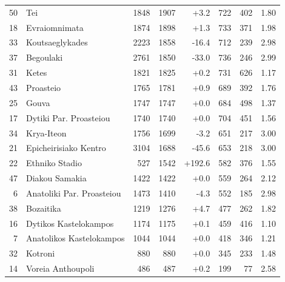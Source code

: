 \begin{scriptsize}
\begin{longtable}{rp{3.4cm}rrrrrr}
50 & Tei & 1848 & 1907 & +3.2 & 722 & 402 & 1.80 \\
18 & Evraiomnimata & 1874 & 1898 & +1.3 & 733 & 371 & 1.98 \\
33 & Koutsaeglykades & 2223 & 1858 & -16.4 & 712 & 239 & 2.98 \\
37 & Begoulaki & 2761 & 1850 & -33.0 & 736 & 246 & 2.99 \\
31 & Ketes & 1821 & 1825 & +0.2 & 731 & 626 & 1.17 \\
43 & Proasteio & 1765 & 1781 & +0.9 & 689 & 392 & 1.76 \\
25 & Gouva & 1747 & 1747 & +0.0 & 684 & 498 & 1.37 \\
17 & Dytiki Par. Proasteiou & 1740 & 1740 & +0.0 & 704 & 451 & 1.56 \\
34 & Krya-Iteon & 1756 & 1699 & -3.2 & 651 & 217 & 3.00 \\
21 & Epicheirisiako Kentro & 3104 & 1688 & -45.6 & 653 & 218 & 3.00 \\
22 & Ethniko Stadio & 527 & 1542 & +192.6 & 582 & 376 & 1.55 \\
47 & Diakou Samakia & 1422 & 1422 & +0.0 & 559 & 264 & 2.12 \\
6 & Anatoliki Par. Proasteiou & 1473 & 1410 & -4.3 & 552 & 185 & 2.98 \\
38 & Bozaitika & 1219 & 1276 & +4.7 & 477 & 262 & 1.82 \\
16 & Dytikos Kastelokampos & 1174 & 1175 & +0.1 & 459 & 416 & 1.10 \\
7 & Anatolikos Kastelokampos & 1044 & 1044 & +0.0 & 418 & 346 & 1.21 \\
32 & Kotroni & 880 & 880 & +0.0 & 345 & 233 & 1.48 \\
14 & Voreia Anthoupoli & 486 & 487 & +0.2 & 199 & 77 & 2.58 \\
\end{longtable}
\end{scriptsize}
